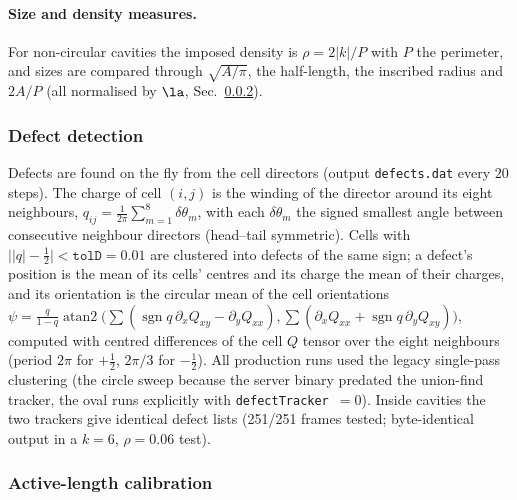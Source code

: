 \paragraph{Size and density measures.} For non-circular cavities the imposed density is $\rho=2|k|/P$ with $P$ the
perimeter, and sizes are compared through $\sqrt{A/\pi}$, the half-length, the inscribed radius and $2A/P$
(all normalised by $\la$, Sec.~\ref{sec:md-la}).

\subsubsection{Defect detection}
\label{sec:md-defects}

Defects are found on the fly from the cell directors (output \texttt{defects.dat} every $20$ steps).
The charge of cell $(i,j)$ is the winding of the director around its eight neighbours,
$q_{ij}=\frac1{2\pi}\sum_{m=1}^{8}\delta\theta_m$, with each $\delta\theta_m$ the signed smallest angle between
consecutive neighbour directors (head--tail symmetric). Cells with $\big||q|-\tfrac12\big|<\texttt{tolD}=0.01$
are clustered into defects of the same sign; a defect's position is the mean of its cells' centres and its
charge the mean of their charges, and its orientation is the circular mean of the cell orientations
$\psi=\frac{q}{1-q}\operatorname{atan2}\!\big(\sum(\operatorname{sgn}q\,\partial_xQ_{xy}-\partial_yQ_{xx}),
\sum(\partial_xQ_{xx}+\operatorname{sgn}q\,\partial_yQ_{xy})\big)$, computed with centred differences of the
cell $Q$ tensor over the eight neighbours (period $2\pi$ for $+\tfrac12$, $2\pi/3$ for $-\tfrac12$).
All production runs used the legacy single-pass clustering (the circle sweep because the server binary predated the
union-find tracker, the oval runs explicitly with \texttt{defectTracker}~$=0$). Inside cavities the two trackers give
identical defect lists (251/251 frames tested; byte-identical output in a $k=6$, $\rho=0.06$ test).

\subsubsection{Active-length calibration}
\label{sec:md-la}

